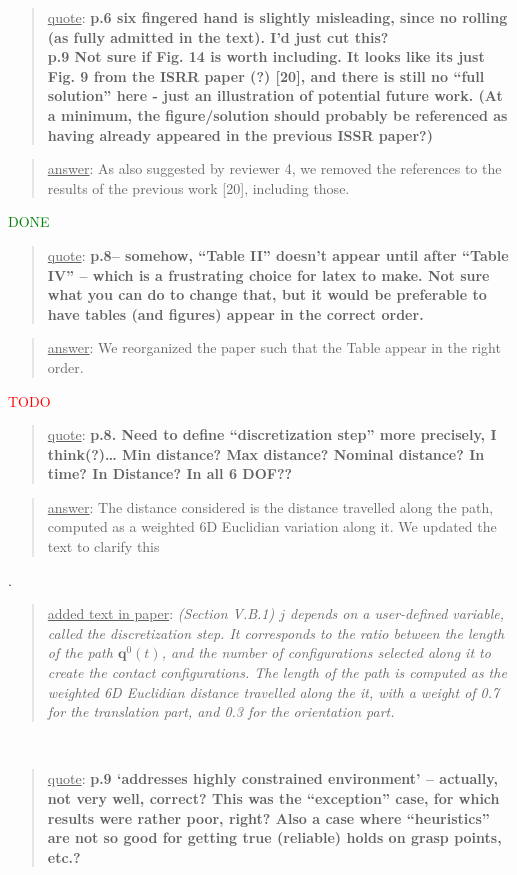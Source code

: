 \documentclass[a4paper]{article}
\newcommand{\done}[0]{\textcolor{green}{DONE}}
\newcommand{\ndone}[0]{\textcolor{red}{TODO}}
\newcommand\quot[1]{\begin{quote} \underline{quote}: \textbf{#1}\end{quote}}
\newcommand\as[1]{\begin{quote} \underline{answer}: {#1}\end{quote} }
\newcommand\qt[1]{\begin{quote} \underline{added text in paper}: \textit{#1}\end{quote} \leavevmode \\ }
\begin{document}
\quot{
p.6 six fingered hand is slightly misleading, since no rolling (as fully admitted in the text). I'd just cut this? \\
p.9 Not sure if Fig. 14 is worth including. It looks like its just Fig. 9 from the ISRR paper (?) [20], and there is still no ``full solution'' here -
 just an illustration of potential future work. 
 (At a minimum, the figure/solution should probably be referenced as having already appeared in the previous ISSR paper?)
}

\as{As also suggested by reviewer 4, we removed the references to the results of the previous work [20], including those.}\done

\quot{
p.8– somehow, “Table II” doesn’t appear until after “Table IV” – which is a frustrating choice for latex to make. Not sure what you can do to change that, but it would be preferable to have tables (and figures) appear in the correct order.
}

\as{We reorganized the paper such that the Table appear in the right order.}\ndone

\quot{
p.8. Need to define ``discretization step'' more precisely, I think(?)… Min distance? Max distance? Nominal distance? In time? In Distance? In all 6 DOF??
}

\as{The distance considered is the distance travelled along the path, computed as a weighted 6D Euclidian variation along it. We updated the text to clarify this}.
\qt{(Section V.B.1) $j$ depends on a user-defined variable, called the discretization step. It corresponds to the ratio between the length of the path $\mathbf{q}^0(t)$, and the number
of configurations selected along it to create the contact configurations. The length of the path is computed as the weighted 6D Euclidian distance
travelled along the it, with a weight of 0.7 for the translation part, and 0.3
for the orientation part.}

\quot{
p.9 ‘addresses highly constrained environment’ – actually, not very well, correct? This was the “exception” case, for which results were rather poor, right? Also a case where “heuristics” are not so good for getting true (reliable) holds on grasp points, etc.?
}
\end{document}
